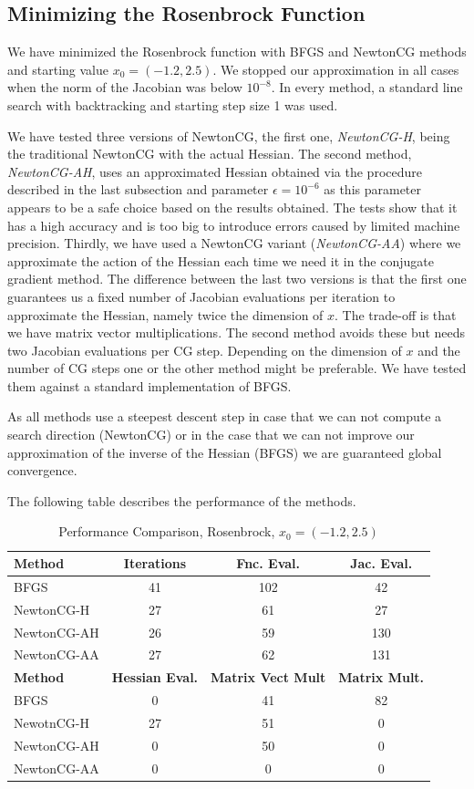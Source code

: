 \documentclass{article}
\begin{document}
\subsection{Minimizing the Rosenbrock Function}
We have minimized the Rosenbrock function with BFGS and NewtonCG methods and starting value
$x_{0}=(-1.2,2.5)$. We stopped our approximation in all cases when the norm of the Jacobian
was below $10^{-8}$. In every method, a standard line search with backtracking and
starting step size 1 was used. \par
We have tested three versions of NewtonCG, the first one, \emph{NewtonCG-H}, being the traditional NewtonCG with the actual Hessian. The second method, \emph{NewtonCG-AH}, uses an approximated Hessian obtained via the procedure described in the last
subsection and parameter $\epsilon=10^{-6}$ as this parameter appears to be a safe choice based on the results obtained. The tests show that it has a high accuracy and is too big to introduce errors caused by limited machine precision. Thirdly, we have used a  NewtonCG variant (\emph{NewtonCG-AA})  where we approximate the action of the
Hessian each time we need it in the conjugate gradient method. The difference between the  last  two versions is that the first one guarantees us a fixed number of Jacobian evaluations per iteration to approximate the Hessian,
namely twice the dimension of $x$. The trade-off is that we have matrix vector multiplications.
The second method avoids these but needs two Jacobian evaluations per CG step. Depending on
the dimension of $x$ and the number of CG steps one or the other method might be preferable.
We have tested them against
a standard implementation of BFGS. \par
As all methods use a steepest descent step in case that we can not compute a search direction (NewtonCG)
or in the case that we can not improve our approximation of the inverse of the Hessian (BFGS) we are
guaranteed global convergence.\par
The following table describes the performance of the methods.
\begin{table}[H]
  \centering
  \begin{tabular}{|l|c|c|c|}
    \hline
   \textbf{Method} & \textbf{Iterations} & \textbf{Fnc. Eval.} &\textbf{Jac. Eval.} \\ \hline
  BFGS &41 &102 &42 \\ \hline
  NewtonCG-H &27 &61 &27 \\ \hline
  NewtonCG-AH&26 &59 &130 \\ \hline
  NewtonCG-AA&27 &62 &131 \\ \hline
 \textbf{Method} & \textbf{Hessian Eval.} & \textbf{Matrix Vect Mult} & \textbf{Matrix Mult.} \\ \hline
   BFGS &0 &41 & 82\\ \hline
   NewotnCG-H &27 &51 &0 \\ \hline
   NewtonCG-AH &0 &50 &0 \\ \hline
   NewtonCG-AA &0 &0 &0 \\ \hline
  \end{tabular}
  \caption{Performance Comparison, Rosenbrock, $x_{0}=(-1.2,2.5)$}
  \label{tab:perform2}
\end{table}
\end{document}
